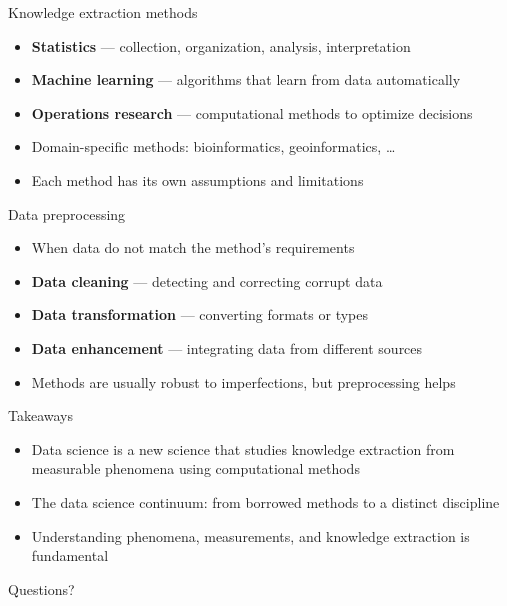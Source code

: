 \begin{frame}{Knowledge extraction methods}
  \begin{itemize}
    \item \textbf{Statistics} --- collection, organization, analysis, interpretation
    \item \textbf{Machine learning} --- algorithms that learn from data automatically
    \item \textbf{Operations research} --- computational methods to optimize decisions
    \item Domain-specific methods: bioinformatics, geoinformatics, \ldots
    \item Each method has its own assumptions and limitations
  \end{itemize}
\end{frame}

\begin{frame}{Data preprocessing}
  \begin{itemize}
    \item When data do not match the method's requirements
    \item \textbf{Data cleaning} --- detecting and correcting corrupt data
    \item \textbf{Data transformation} --- converting formats or types
    \item \textbf{Data enhancement} --- integrating data from different sources
    \item Methods are usually robust to imperfections, but preprocessing helps
  \end{itemize}
\end{frame}


\begin{frame}{Takeaways}
  \begin{itemize}
    \item Data science is a new science that studies knowledge extraction
      from measurable phenomena using computational methods
    \item The data science continuum: from borrowed methods to a distinct discipline
    \item Understanding phenomena, measurements, and knowledge extraction
      is fundamental
  \end{itemize}
\end{frame}


\begin{frame}[standout]
  Questions?
\end{frame}


